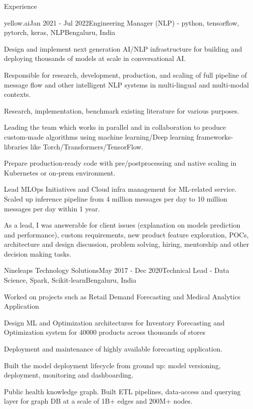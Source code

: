 \documentclass{resume}
\begin{document}
\begin{rSection}{Experience}
    \begin{rSubsection}{yellow.ai}{Jan 2021 - Jul 2022}{Engineering Manager (NLP) - python, tensorflow, pytorch, keras, NLP}{Bengaluru, India}
    \item Design and implement next generation AI/NLP infrastructure for building and deploying thousands of models at scale in conversational AI.
    \item Responsible for research, development, production, and scaling of full pipeline of message flow and other intelligent NLP systems in multi‐lingual and multi‐modal contexts.
    \item Research, implementation, benchmark existing literature for various purposes.
    \item Leading the team which works in parallel and in collaboration to produce custom‐made algorithms using machine learning/Deep learning frameworks‐libraries like Torch/Transformers/TensorFlow.
    \item Prepare production‐ready code with pre/postprocessing and native scaling in Kubernetes or on‐prem environment.
    \item Lead MLOps Initiatives and Cloud infra management for ML‐related service. Scaled up inference pipeline from 4 million messages per day to 10 million messages per day within 1 year.
    \item As a lead, I was answerable for client issues (explanation on models prediction and performance), custom requirements, new product feature exploration, POCs, architecture and design discussion, problem solving, hiring, mentorship and other decision making tasks.
    \end{rSubsection}
  
    \begin{rSubsection}{Nineleaps Technology Solutions}{May 2017 - Dec 2020}{Technical Lead - Data Science, Spark, Scikit-learn}{Bengaluru, India}
    \item Worked on projects such as Retail Demand Forecasting and Medical Analytics Application
    \item Design ML and Optimization architectures for Inventory Forecasting and Optimization system for 40000 products across thousands of stores
    \item Deployment and maintenance of highly available forecasting application.
    \item Built the model deployment lifecycle from ground up: model versioning, deployment, monitoring and dashboarding.
    \item Public health knowledge graph. Built ETL pipelines, data‐access and querying layer for graph DB at a scale of 1B+ edges and 200M+ nodes.
    \end{rSubsection}


\end{rSection}
\end{document}
